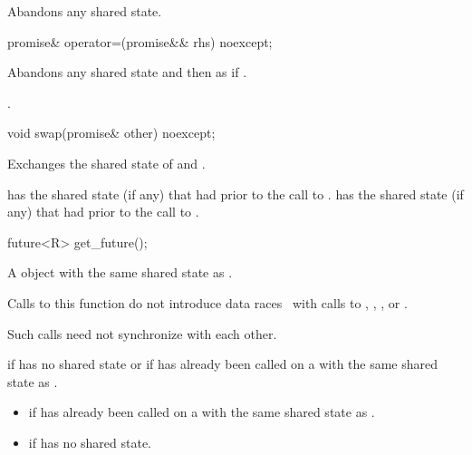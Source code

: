 \begin{itemdescr}
\pnum
\effects
Abandons any shared state.
\end{itemdescr}

%
\begin{itemdecl}
promise& operator=(promise&& rhs) noexcept;
\end{itemdecl}

\begin{itemdescr}
\pnum
\effects
Abandons any shared state and then as if
.

\pnum
\returns {}.
\end{itemdescr}

%
\begin{itemdecl}
void swap(promise& other) noexcept;
\end{itemdecl}

\begin{itemdescr}
\pnum
\effects Exchanges the shared state of  and .

\pnum
\ensures {} has the shared state (if any) that  had
prior to the call to .  has the shared state (if any) that
 had prior to the call to .
\end{itemdescr}

%
\begin{itemdecl}
future<R> get_future();
\end{itemdecl}

\begin{itemdescr}
\pnum
\returns A  object with the same shared state as
.

\pnum
\sync Calls to this function do not introduce
data races~ with calls to
,
,
, or
.
\begin{note}
Such calls need not synchronize with each other.
\end{note}

\pnum
\throws {} if  has no shared state or if
 has already been called on a  with the same
shared state as .

\pnum
\errors

\begin{itemize}
\item {} if  has already been called on
a  with the same shared state as .

\item {} if  has no shared state.
\end{itemize}
\end{itemdescr}

